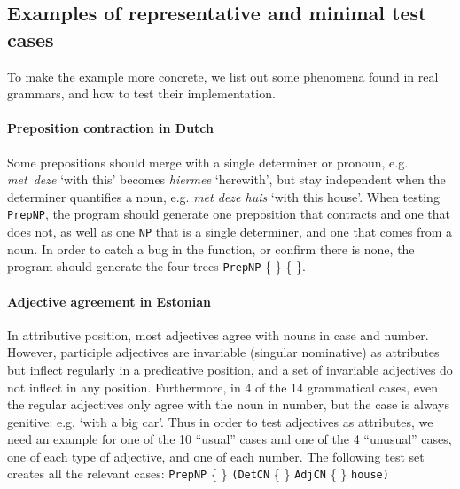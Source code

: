 \documentclass[11pt]{article}
\def\t#1{\texttt{#1}}
\begin{document}
\subsection{Examples of representative and minimal test cases} 
To make the example more concrete, we list out some phenomena found in
real grammars, and how to test their implementation. 

\paragraph{Preposition contraction in Dutch} Some prepositions should
merge with a single determiner or pronoun, e.g. \emph{met~deze} `with
this' becomes \emph{hiermee} `herewith', but stay independent when the
determiner quantifies a noun, e.g. \emph{met deze huis} `with this
house'. When testing \t{PrepNP}, the program should generate one
preposition that contracts and one that does not, as well as one
\t{NP} that is a single determiner, and one that comes from a noun.
In order to catch a bug in the function, or confirm there is none, the
program should generate the four trees 
\t{PrepNP} \{  \} 
           \{  \}. 

\paragraph{Adjective agreement in Estonian} In attributive position,
most adjectives agree with nouns in case and number. However,
participle adjectives are invariable (singular nominative) as
attributes but inflect regularly in a predicative position, and a set
of invariable adjectives do not inflect in any position. Furthermore,
in 4 of the 14 grammatical cases, even the regular adjectives only
agree with the noun in number, but the case is always genitive: e.g. 
`with a big car'. 
Thus in order to test adjectives as attributes, we need an example for
one of the 10 ``usual'' cases and one of the 4 ``unusual'' cases, one
of each type of adjective, and one of each number.  
The following test set creates all the relevant cases:
 \t{PrepNP} \{  \}
             {\tt (DetCN} \{  \} 
             {\tt AdjCN}  \{  \} 
             {\tt house)}
\end{document}
